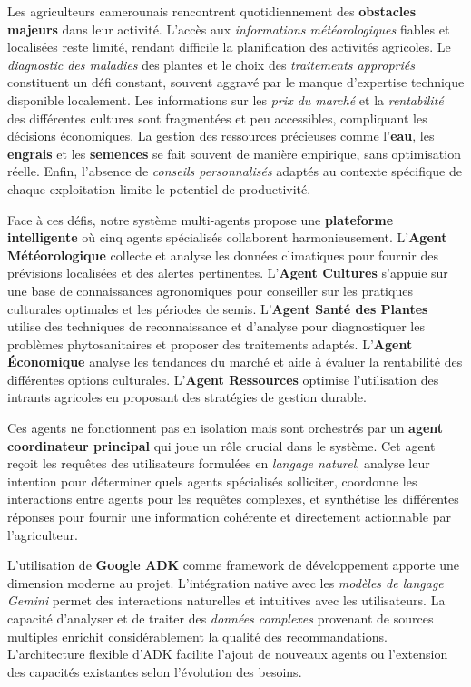 Les agriculteurs camerounais rencontrent quotidiennement des \textbf{obstacles majeurs} dans leur activité. L'accès aux \emph{informations météorologiques} fiables et localisées reste limité, rendant difficile la planification des activités agricoles. Le \emph{diagnostic des maladies} des plantes et le choix des \emph{traitements appropriés} constituent un défi constant, souvent aggravé par le manque d'expertise technique disponible localement. Les informations sur les \emph{prix du marché} et la \emph{rentabilité} des différentes cultures sont fragmentées et peu accessibles, compliquant les décisions économiques. La gestion des ressources précieuses comme l'\textbf{eau}, les \textbf{engrais} et les \textbf{semences} se fait souvent de manière empirique, sans optimisation réelle. Enfin, l'absence de \emph{conseils personnalisés} adaptés au contexte spécifique de chaque exploitation limite le potentiel de productivité.

Face à ces défis, notre système multi-agents propose une \textbf{plateforme intelligente} où cinq agents spécialisés collaborent harmonieusement. L'\textbf{Agent Météorologique} collecte et analyse les données climatiques pour fournir des prévisions localisées et des alertes pertinentes. L'\textbf{Agent Cultures} s'appuie sur une base de connaissances agronomiques pour conseiller sur les pratiques culturales optimales et les périodes de semis. L'\textbf{Agent Santé des Plantes} utilise des techniques de reconnaissance et d'analyse pour diagnostiquer les problèmes phytosanitaires et proposer des traitements adaptés. L'\textbf{Agent Économique} analyse les tendances du marché et aide à évaluer la rentabilité des différentes options culturales. L'\textbf{Agent Ressources} optimise l'utilisation des intrants agricoles en proposant des stratégies de gestion durable.

Ces agents ne fonctionnent pas en isolation mais sont orchestrés par un \textbf{agent coordinateur principal} qui joue un rôle crucial dans le système. Cet agent reçoit les requêtes des utilisateurs formulées en \emph{langage naturel}, analyse leur intention pour déterminer quels agents spécialisés solliciter, coordonne les interactions entre agents pour les requêtes complexes, et synthétise les différentes réponses pour fournir une information cohérente et directement actionnable par l'agriculteur.

L'utilisation de \textbf{Google ADK} comme framework de développement apporte une dimension moderne au projet. L'intégration native avec les \emph{modèles de langage Gemini} permet des interactions naturelles et intuitives avec les utilisateurs. La capacité d'analyser et de traiter des \emph{données complexes} provenant de sources multiples enrichit considérablement la qualité des recommandations. L'architecture flexible d'ADK facilite l'ajout de nouveaux agents ou l'extension des capacités existantes selon l'évolution des besoins.